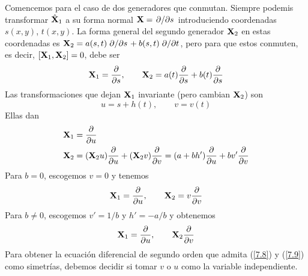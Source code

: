     Comencemos para el caso de dos generadores que conmutan. Siempre podemis transformar $\hat{\vb{X}}_1$ a su forma normal $\vb{X}=\pdv*{s}$ introduciendo coordenadas $s(x,y)$, $t(x,y)$. La forma general del segundo generador $\vb{X}_2$ en estas coordenadas es $\vb{X}_2=a(s,t)\pdv*{s}+b(s,t)\pdv*{t}$, pero para que estos conmuten, es decir, $[\vb{X}_1,\vb{X}_2]=0$, debe ser
    \begin{equation}
        \vb{X}_1=\pdv{s},\qquad \vb{X}_2=a(t)\pdv{s}+b(t)\pdv{s}
    \end{equation}
    Las transformaciones que dejan $\vb{X}_1$ invariante (pero cambian $\vb{X}_2$) son
    \begin{equation}
        u=s+h(t),\qquad v=v(t)
    \end{equation}
    Ellas dan
    \begin{align}
        \vb{X}_1&=\pdv{u}\\
        \vb{X}_2&=(\vb{X}_2u)\pdv{u}+(\vb{X}_2 v)\pdv{v}=(a+bh')\pdv{u}+bv'\pdv{v}
    \end{align}
    Para $b=0$, escogemos $v=0$ y tenemos
    \begin{equation}\label{7.8}
        \vb{X}_1=\pdv{u}, \qquad \vb{X}_2=v\pdv{v}
    \end{equation}
    Para $b\neq 0$, escogemos $v'=1/b$ y $h'=-a/b$ y obtenemos
    \begin{equation}\label{7.9}
        \vb{X}_1=\pdv{u},\qquad \vb{X}_2\pdv{v}
    \end{equation}
    Para obtener la ecuación diferencial de segundo orden que admita (\ref{7.8}) y (\ref{7.9}) como simetrías, debemos decidir si tomar $v$ o $u$ como la variable independiente.
    
    
    
